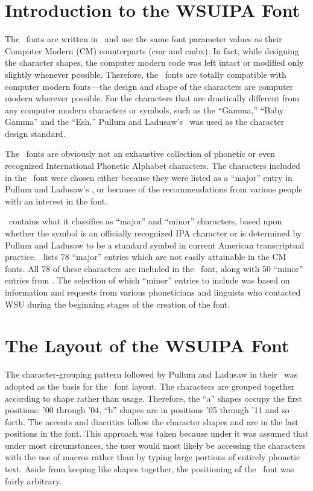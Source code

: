 \section{Introduction to the WSUIPA Font}

The \wsu\ fonts are written in \MF\ and use the same font parameter
values as their Computer Modern (CM) counterparts (cmr and cmbx). In
fact, while designing the character shapes, the computer modern code
was left intact or modified only slightly whenever possible.
Therefore, the \wsu\ fonts are totally compatible with computer modern
fonts---the design and shape of the characters are computer modern
wherever possible. For the characters that are drastically different
from any computer modern characters or symbols, such as the ``Gamma,''
``Baby Gamma'' and the ``Esh,'' Pullum and Ladusaw's \PL\ was used as
the character design standard.

The \wsu\ fonts are obviously not an exhaustive collection of phonetic
or even recognized International Phonetic Alphabet characters. The
characters included in the \wsu\ font were chosen either because they
were listed as a ``major'' entry in Pullum and Ladusaw's \PL, or
because of the recommendations from various people with an interest in
the font.

\PL\ contains what it classifies as ``major'' and ``minor''
characters, based upon whether the symbol is an officially recognized
IPA character or is determined by Pullum and Ladusaw to be a standard
symbol in current American transcriptual practice. \PL\ lists 78
``major'' entries which are not easily attainable in the CM fonts. All
78 of these characters are included in the \wsu\ font, along with 50
``minor'' entries from \PL. The selection of which ``minor'' entries
to include was based on information and requests from various
phoneticians and linguists who contacted WSU during the beginning
stages of the creation of the font.


\section{The Layout of the WSUIPA Font}

The character-grouping pattern followed by Pullum and Ladusaw in their
\PL\ was adopted as the basis for the \wsu\ font layout. The
characters are grouped together according to shape rather than usage.
Therefore, the ``a'' shapes occupy the first positions: '00 through
'04, ``b'' shapes are in positions '05 through '11 and so forth. The
accents and diacritics follow the character shapes and are in the last
positions in the font. This approach was taken because under it was
assumed that under most circumstances, the user would most likely be
accessing the characters with the use of macros rather than by typing
large portions of entirely phonetic text. Aside from keeping like
shapes together, the positioning of the \wsu\ font was fairly
arbitrary.


